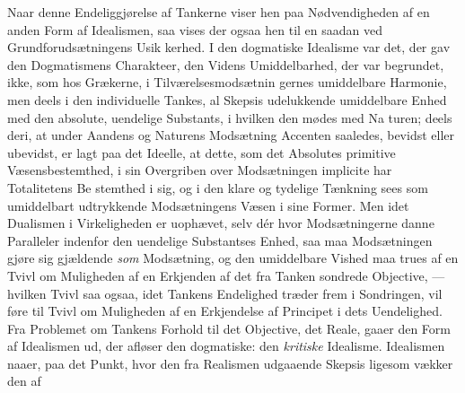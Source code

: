 \documentclass[12pt,a4paper]{book}
\begin{document}
Naar denne Endeliggjørelse af Tankerne viser hen paa
Nødvendigheden af en anden Form af Idealismen, saa vises
der ogsaa hen til en saadan ved Grundforudsætningens Usik\-%
kerhed. I den dogmatiske Idealisme var det, der gav den
Dogmatismens Charakteer, den Videns Umiddelbarhed, der var
begrundet, ikke, som hos Grækerne, i Tilværelsesmodsætnin\-%
gernes umiddelbare Harmonie, men deels i den individuelle
Tankes, al Skepsis udelukkende umiddelbare Enhed med den
absolute, uendelige Substants, i hvilken den mødes med Na\-%
turen; deels deri, at under Aandens og Naturens Modsætning
Accenten saaledes, bevidst eller ubevidst, er lagt paa det Ideelle,
at dette, som det Absolutes primitive Væsensbestemthed, i sin
Overgriben over Modsætningen implicite har Totalitetens Be\-%
stemthed i sig, og i den klare og tydelige Tænkning sees som
umiddelbart udtrykkende Modsætningens Væsen i sine Former.
Men idet Dualismen i Virkeligheden er uophævet, selv dér
hvor Modsætningerne danne Paralleler indenfor den uendelige
Substantses Enhed, saa maa Modsætningen gjøre sig gjældende
\emph{som} Modsætning, og den umiddelbare Vished maa trues af
en Tvivl om Muligheden af en Erkjenden af det fra Tanken
sondrede Objective, --- hvilken Tvivl saa ogsaa, idet Tankens
Endelighed træder frem i Sondringen, vil føre til Tvivl om
Muligheden af en Erkjendelse af Principet i dets Uendelighed.
Fra Problemet om Tankens Forhold til det Objective, det Reale,
gaaer den Form af Idealismen ud, der afløser den dogmatiske:
den \emph{kritiske} Idealisme. Idealismen naaer, paa det Punkt, hvor
den fra Realismen udgaaende Skepsis ligesom vækker den af
\end{document}
